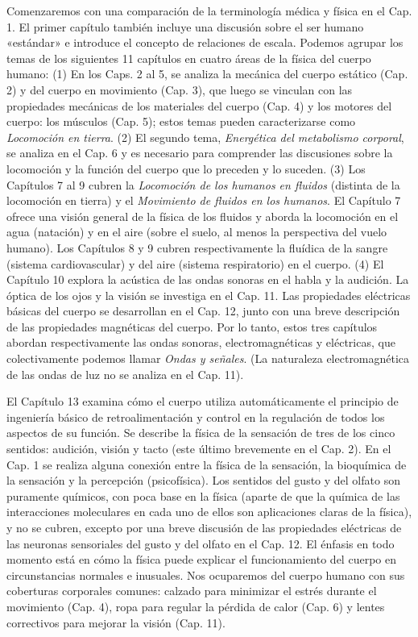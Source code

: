 ﻿\documentclass{book}
\begin{document}
Comenzaremos con una comparación de la terminología médica y física en el Cap. 1. El primer capítulo también incluye una discusión sobre el ser humano «estándar» e introduce el concepto de relaciones de escala. Podemos agrupar los temas de los siguientes 11 capítulos en cuatro áreas de la física del cuerpo humano: (1) En los Caps. 2 al 5, se analiza la mecánica del cuerpo estático (Cap. 2) y del cuerpo en movimiento (Cap. 3), que luego se vinculan con las propiedades mecánicas de los materiales del cuerpo (Cap. 4) y los motores del cuerpo: los músculos (Cap. 5); estos temas pueden caracterizarse como \textit{Locomoción en tierra}. (2) El segundo tema, \textit{Energética del metabolismo corporal}, se analiza en el Cap. 6 y es necesario para comprender las discusiones sobre la locomoción y la función del cuerpo que lo preceden y lo suceden. (3) Los Capítulos 7 al 9 cubren la \textit{Locomoción de los humanos en fluidos} (distinta de la locomoción en tierra) y el \textit{Movimiento de fluidos en los humanos}. El Capítulo 7 ofrece una visión general de la física de los fluidos y aborda la locomoción en el agua (natación) y en el aire (sobre el suelo, al menos la perspectiva del vuelo humano). Los Capítulos 8 y 9 cubren respectivamente la fluídica de la sangre (sistema cardiovascular) y del aire (sistema respiratorio) en el cuerpo. (4) El Capítulo 10 explora la acústica de las ondas sonoras en el habla y la audición. La óptica de los ojos y la visión se investiga en el Cap. 11. Las propiedades eléctricas básicas del cuerpo se desarrollan en el Cap. 12, junto con una breve descripción de las propiedades magnéticas del cuerpo. Por lo tanto, estos tres capítulos abordan respectivamente las ondas sonoras, electromagnéticas y eléctricas, que colectivamente podemos llamar \textit{Ondas y señales}. (La naturaleza electromagnética de las ondas de luz no se analiza en el Cap. 11).

El Capítulo 13 examina cómo el cuerpo utiliza automáticamente el principio de ingeniería básico de retroalimentación y control en la regulación de todos los aspectos de su función. Se describe la física de la sensación de tres de los cinco sentidos: audición, visión y tacto (este último brevemente en el Cap. 2). En el Cap. 1 se realiza alguna conexión entre la física de la sensación, la bioquímica de la sensación y la percepción (psicofísica). Los sentidos del gusto y del olfato son puramente químicos, con poca base en la física (aparte de que la química de las interacciones moleculares en cada uno de ellos son aplicaciones claras de la física), y no se cubren, excepto por una breve discusión de las propiedades eléctricas de las neuronas sensoriales del gusto y del olfato en el Cap. 12. El énfasis en todo momento está en cómo la física puede explicar el funcionamiento del cuerpo en circunstancias normales e inusuales. Nos ocuparemos del cuerpo humano con sus coberturas corporales comunes: calzado para minimizar el estrés durante el movimiento (Cap. 4), ropa para regular la pérdida de calor (Cap. 6) y lentes correctivos para mejorar la visión (Cap. 11).
\end{document}
